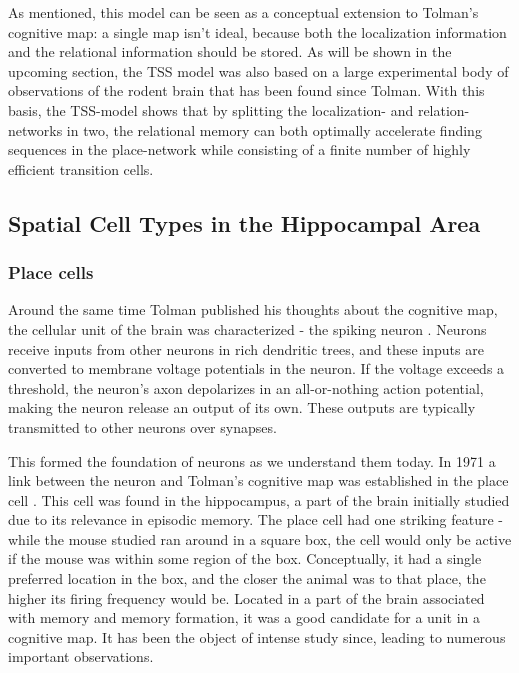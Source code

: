 \documentclass{article}
\begin{document}
    As mentioned, this model can be seen as a conceptual extension to Tolman's cognitive map: a single map isn't ideal, because both the localization information and the relational information should be stored. As will be shown in the upcoming section, the TSS model was also based on a large experimental body of observations of the rodent brain that has been found since Tolman. With this basis, the TSS-model shows that by splitting the localization- and relation-networks in two, the relational memory can both optimally accelerate finding sequences in the place-network while consisting of a finite number of highly efficient transition cells.

    \subsection{Spatial Cell Types in the Hippocampal Area} \label{Spatial Cell}
    
    \subsubsection{Place cells} \label{place cells}
    Around the same time Tolman published his thoughts about the cognitive map, the cellular unit of the brain was characterized - the spiking neuron \parencite{Hodgkin1952}. Neurons receive inputs from other neurons in rich dendritic trees, and these inputs are converted to membrane voltage potentials in the neuron. If the voltage exceeds a threshold, the neuron's axon depolarizes in an all-or-nothing action potential, making the neuron release an output of its own. These outputs are typically transmitted to other neurons over synapses.

    This formed the foundation of neurons as we understand them today. In 1971 a link between the neuron and Tolman's cognitive map was established in the place cell \parencite{OKeefe1971,OKeefe1976}. This cell was found in the hippocampus, a part of the brain initially studied due to its relevance in episodic memory. The place cell had one striking feature - while the mouse studied ran around in a square box, the cell would only be active if the mouse was within some region of the box. Conceptually, it had a single preferred location in the box, and the closer the animal was to that place, the higher its firing frequency would be. Located in a part of the brain associated with memory and memory formation, it was a good candidate for a unit in a cognitive map. It has been the object of intense study since, leading to numerous important observations.
\end{document}
